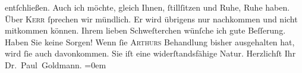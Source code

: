 \begin{ledgroupsized}[t]{13cm}
               entſchließen. Auch ich möchte, gleich Ihnen, ſtillſitzen und Ruhe, Ruhe haben. Über
                  \textsc{Kerr} ſprechen wir mündlich. Er wird übrigens nur nachkommen und nicht mitkommen
               können. Ihrem lieben Schweſterchen wünſche ich gute Beſſerung. Haben Sie keine Sorgen! Wenn ſie
                  \textsc{Arthurs} Behandlung bisher ausgehalten hat, wird ſie auch
               davonkommen. Sie iſt eine widerſtandsfähige Natur.\pend
           \pstart
           Herzlichſt Ihr {\\[\baselineskip]}\spacefill\mbox{Dr. Paul Goldmann.}\pend
           \leftskip=0em{}
         
         \endnumbering{}\end{ledgroupsized}  \newcommand{\dateiname}{L03072}\newcommand{\titel}{Paul Goldmann an Arthur Schnitzler und Olga Gussmann, 7. 7. [1901]}\newcommand{\editorInnen}{Martin Anton Müller und Laura Untner}
      